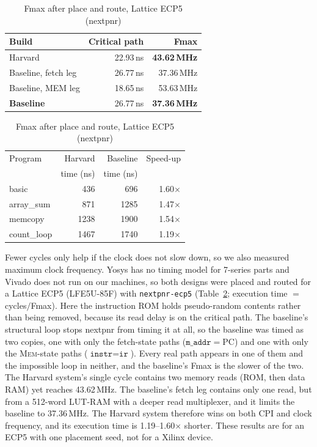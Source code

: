 \documentclass[conference]{IEEEtran}
\newcommand{\sig}[1]{\texttt{#1}}
\begin{document}
\begin{table}[t]
  \caption{Fmax after place and route, Lattice ECP5 (nextpnr)}
  \label{tab:fmax}
  \centering
  \setlength{\tabcolsep}{4pt}
  \begin{tabular}{@{}lrr@{}}
    \toprule
    Build & Critical path & Fmax \\
    \midrule
    Harvard               & 22.93\,ns & \textbf{43.62\,MHz} \\
    Baseline, fetch leg   & 26.77\,ns & 37.36\,MHz \\
    Baseline, MEM leg     & 18.65\,ns & 53.63\,MHz \\
    \textbf{Baseline}     & 26.77\,ns & \textbf{37.36\,MHz} \\
    \bottomrule
  \end{tabular}

  \vspace{6pt}
  \begin{tabular}{@{}lrrr@{}}
    \toprule
    Program & Harvard & Baseline & Speed-up \\
    & time (ns) & time (ns) & \\
    \midrule
    basic      &  436 &  696 & 1.60$\times$ \\
    array\_sum &  871 & 1285 & 1.47$\times$ \\
    memcopy    & 1238 & 1900 & 1.54$\times$ \\
    count\_loop& 1467 & 1740 & 1.19$\times$ \\
    \bottomrule
  \end{tabular}
\end{table}

Fewer cycles only help if the clock does not slow down, so we also measured maximum clock
frequency. Yosys has no timing model for 7-series parts and Vivado does not run on our machines,
so both designs were placed and routed for a Lattice ECP5 (LFE5U-85F) with \texttt{nextpnr-ecp5}
(Table~\ref{tab:fmax}; execution time $=$ cycles$/$Fmax). Here the instruction ROM holds
pseudo-random contents rather than being removed, because its read delay is on the critical path.
The baseline's structural loop stops nextpnr from timing it at all, so the baseline was timed as
two copies, one with only the fetch-state paths ($\sig{m\_addr} = \mathrm{PC}$) and one with only
the \textsc{Mem}-state paths ($\sig{instr} = \sig{ir}$). Every real path appears in one of them
and the impossible loop in neither, and the baseline's Fmax is the slower of the two. The Harvard
system's single cycle contains two memory reads (ROM, then data RAM) yet reaches 43.62\,MHz. The
baseline's fetch leg contains only one read, but from a 512-word LUT-RAM with a deeper read
multiplexer, and it limits the baseline to 37.36\,MHz. The Harvard system therefore wins on both
CPI and clock frequency, and its execution time is 1.19--1.60$\times$ shorter. These results are
for an ECP5 with one placement seed, not for a Xilinx device.
\end{document}
